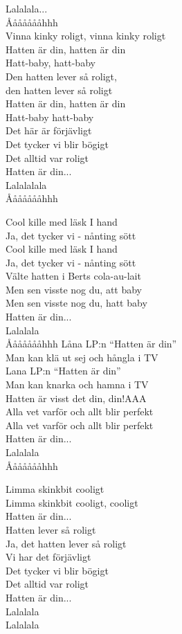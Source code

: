 \vspace{10pt}
Lalalala...\\
Åååååååhhh\\
Vinna kinky roligt, vinna kinky roligt\\
Hatten är din, hatten är din\\
Hatt-baby, hatt-baby\\
Den hatten lever så roligt,\\
den hatten lever så roligt\\
Hatten är din, hatten är din\\
Hatt-baby hatt-baby\\
Det här är förjävligt\\
Det tycker vi blir bögigt\\
Det alltid var roligt\\
\revrpt Hatten är din...\rpt\\
Lalalalala\\
Åååååååhhh\par
\vspace{10pt}
Cool kille med läsk I hand\\
Ja, det tycker vi - nånting sött\\
Cool kille med läsk I hand\\
Ja, det tycker vi - nånting sött\\
\revrpt Välte hatten i Berts cola-au-lait\rpt \\
\revrpt Men sen visste nog du, att baby\rpt \\
\revrpt Men sen visste nog du, hatt baby\rpt \\
Hatten är din...\\
Lalalala\\
Åååååååhhh
\newpage
Låna LP:n ``Hatten är din''\\
Man kan klä ut sej och hångla i TV\\
Lana LP:n ``Hatten är din''\\
Man kan knarka och hamna i TV\\
\revrpt Hatten är visst det din, din!AAA\rpt \\
\revrpt Alla vet varför och allt blir perfekt \\
Alla vet varför och allt blir perfekt\rpt \\
Hatten är din... \\
Lalalala\\
Åååååååhhh\par
\vspace{10pt}
Limma skinkbit cooligt\\
Limma skinkbit cooligt, cooligt\\
Hatten är din...\\
\revrpt Hatten lever så roligt\rpt \\
Ja, det hatten lever så roligt\\
Vi har det förjävligt\\
Det tycker vi blir bögigt\\
Det alltid var roligt\\
\revrpt Hatten är din...\rpt \\
Lalalala\\
Lalalala
